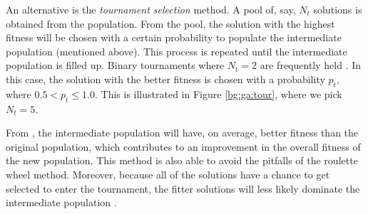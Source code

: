 \documentclass[12pt, twoside, a4paper]{report}
\begin{document}
An alternative is the \textit{tournament selection} method. A pool of, say, $N_t$ solutions is obtained from the population. From the pool, the solution with the highest fitness will be chosen with a certain probability to populate the intermediate population (mentioned above). This process is repeated until the intermediate population is filled up.  Binary tournaments where $N_t=2$ are frequently held \cite{RefWorks:242, RefWorks:243}. In this case, the solution with the better fitness is chosen with a probability $p_t$, where $0.5 < p_t \leq 1.0$. This is illustrated in Figure \ref{bg:ga:tour}, where we pick $N_t=5$.

From \cite{RefWorks:242}, the intermediate population will have, on average, better fitness than the original population, which contributes to an improvement in the overall fitness of the new population. This method is also able to avoid the pitfalls of the roulette wheel method. Moreover, because all of the solutions have a chance to get selected to enter the tournament, the fitter solutions will less likely dominate the intermediate population \cite{RefWorks:245}.
\end{document}
